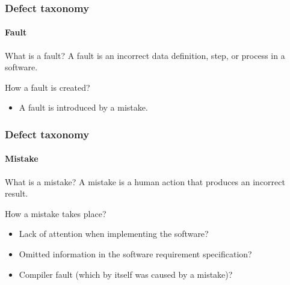\begin{frame}[parent={cmap:software-testing},hasnext=true,hasprev=true]
\frametitle{Defect taxonomy}
\framesubtitle{Fault}
\label{concept:fault}

\begin{block:concept}{What is a fault?}
A fault is an incorrect data definition, step, or process in a software.
\end{block:concept}

\begin{block:fact}{How a fault is created?}
\begin{itemize}
	\item A fault is introduced by a mistake.
\end{itemize}
\end{block:fact}

\hfill
{}
\end{frame}



\begin{frame}
\label{concept:mistake}
\frametitle{Defect taxonomy}
\framesubtitle{Mistake}

\begin{block:concept}{What is a mistake?}
A mistake is a human action that produces an incorrect result.
\end{block:concept}

\begin{block:fact}{How a mistake takes place?}
\begin{itemize}
	\item Lack of attention when implementing the software?

	\item Omitted information in the software requirement specification?

	\item Compiler fault (which by itself was caused by a mistake)?
\end{itemize}
\end{block:fact}

\hfill
{}
\end{frame}



